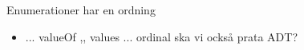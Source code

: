 


\begin{Slide}{Enumerationer har en ordning}
\begin{itemize}
\item \TODO ...  valueOf  ,, values ... ordinal   ska vi också prata ADT?
\end{itemize}
\end{Slide}